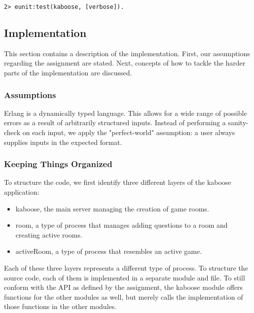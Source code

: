 \documentclass[11pt, a4paper]{article}
\begin{document}
\begin{verbatim}
2> eunit:test(kaboose, [verbose]).
\end{verbatim}




\pagebreak
\subsection{Implementation}
This section contains a description of the implementation. First, our assumptions regarding the assignment are stated. Next, concepts of how to tackle the harder parts of the implementation are discussed.

\subsubsection{Assumptions} \label{perfect-world}
Erlang is a dynamically typed language. This allows for a wide range of possible errors as a result of arbitrarily structured inputs. Instead of performing a sanity-check on each input, we apply the "perfect-world" assumption: a user always supplies inputs in the expected format. 


\subsubsection{Keeping Things Organized}
To structure the code, we first identify three different layers of the kaboose application:
\begin{itemize}
	\item kaboose, the main server managing the creation of game rooms.
	\item room, a type of process that manages adding questions to a room and creating active rooms.
	\item activeRoom, a type of process that resembles an active game.
\end{itemize}
Each of these three layers represents a different type of process. To structure the source code, each of them is implemented in a separate module and file. To still conform with the API as defined by the assignment, the kaboose module offers functions for the other modules as well, but merely calls the implementation of those functions in the other modules.
\end{document}
